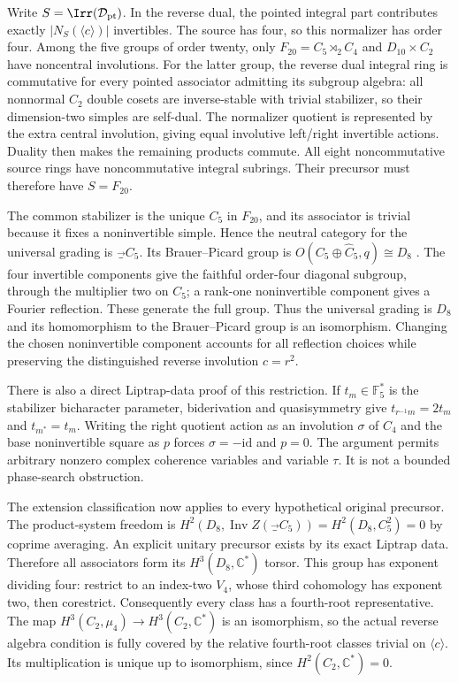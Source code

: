 Write $S=\Irr(\mathcal D_{\rm pt})$. In the reverse dual, the pointed integral
part contributes exactly $|N_S(\langle c\rangle)|$ invertibles. The source has four,
so this normalizer has order four. Among the five groups of order twenty, only
$F_{20}=C_5\rtimes_2 C_4$ and $D_{10}\times C_2$ have noncentral involutions.
For the latter group, the reverse dual integral ring is commutative for every
pointed associator admitting its subgroup algebra: all nonnormal $C_2$ double
cosets are inverse-stable with trivial stabilizer, so their dimension-two simples
are self-dual. The normalizer quotient is represented by the extra central
involution, giving equal involutive left/right invertible actions. Duality then
makes the remaining products commute. All eight noncommutative source rings have
noncommutative integral subrings. Their precursor must therefore have $S=F_{20}$.

The common stabilizer is the unique $C_5$ in $F_{20}$, and its associator is trivial
because it fixes a noninvertible simple. Hence the neutral category for the universal
grading is $\Vec_{C_5}$. Its Brauer--Picard group is
$O(C_5\oplus\widehat C_5,q)\cong D_8$ \cite{ENO}. The four invertible components
give the faithful order-four diagonal subgroup, through the multiplier two on
$C_5$; a rank-one noninvertible component gives a Fourier reflection. These
generate the full group. Thus the universal grading is $D_8$ and its homomorphism
to the Brauer--Picard group is an isomorphism. Changing the chosen noninvertible
component accounts for all reflection choices while preserving the distinguished
reverse involution $c=r^2$.

There is also a direct Liptrap-data proof of this restriction. If $t_m\in\mathbb F_5^*$
is the stabilizer bicharacter parameter, biderivation and quasisymmetry give
$t_{r^{-1}m}=2t_m$ and $t_{m^*}=t_m$. Writing the right quotient action as
an involution $\sigma$ of $C_4$ and the base noninvertible square as $p$ forces
$\sigma=-\mathrm{id}$ and $p=0$. The argument permits arbitrary nonzero complex
coherence variables and variable $\tau$. It is not a bounded phase-search obstruction.

The extension classification \cite{ENO} now applies to every hypothetical original
precursor. The product-system freedom is
$H^2(D_8,\operatorname{Inv}Z(\Vec_{C_5}))=H^2(D_8,C_5^2)=0$ by coprime averaging.
An explicit unitary precursor exists by its exact Liptrap data. Therefore all
associators form its $H^3(D_8,\mathbb C^*)$ torsor. This group has exponent dividing
four: restrict to an index-two $V_4$, whose third cohomology has exponent two,
then corestrict. Consequently every class has a fourth-root representative.
The map $H^3(C_2,\mu_4)\to H^3(C_2,\mathbb C^*)$ is an isomorphism, so the actual
reverse algebra condition is fully covered by the relative fourth-root classes
trivial on $\langle c\rangle$. Its multiplication is unique up to isomorphism,
since $H^2(C_2,\mathbb C^*)=0$.

